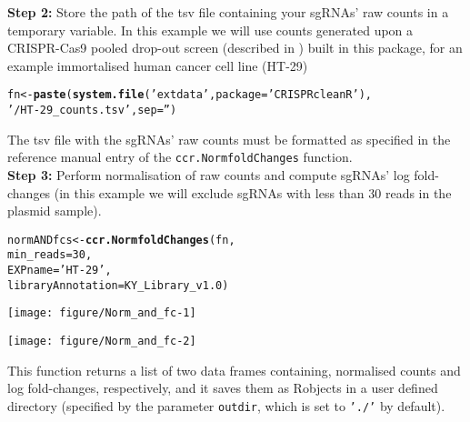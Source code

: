 \documentclass{article}\usepackage[]{graphicx}\usepackage[]{color}
\makeatletter
\def\maxwidth{ %
  \ifdim\Gin@nat@width>\linewidth
    \linewidth
  \else
    \Gin@nat@width
  \fi
}
\newcommand{\hlnum}[1]{\textcolor[rgb]{0.686,0.059,0.569}{#1}}%
\newcommand{\hlstr}[1]{\textcolor[rgb]{0.192,0.494,0.8}{#1}}%
\newcommand{\hlstd}[1]{\textcolor[rgb]{0.345,0.345,0.345}{#1}}%
\newcommand{\hlkwb}[1]{\textcolor[rgb]{0.69,0.353,0.396}{#1}}%
\newcommand{\hlkwc}[1]{\textcolor[rgb]{0.333,0.667,0.333}{#1}}%
\newcommand{\hlkwd}[1]{\textcolor[rgb]{0.737,0.353,0.396}{\textbf{#1}}}%
\newenvironment{kframe}{%
 \def\at@end@of@kframe{}%
 \ifinner\ifhmode%
  \def\at@end@of@kframe{\end{minipage}}%
  \begin{minipage}{\columnwidth}%
 \fi\fi%
 \def\FrameCommand##1{\hskip\@totalleftmargin \hskip-\fboxsep
 \colorbox{shadecolor}{##1}\hskip-\fboxsep
     \hskip-\linewidth \hskip-\@totalleftmargin \hskip\columnwidth}%
 \MakeFramed {\advance\hsize-\width
   \@totalleftmargin\z@ \linewidth\hsize
   \@setminipage}}%
 {\par\unskip\endMakeFramed%
 \at@end@of@kframe}
\newenvironment{knitrout}{}{} %
\makeatother
\begin{document}
\textbf{Step 2:} Store the path of the tsv file containing your sgRNAs' raw counts in a temporary variable. In this example we will use counts generated upon a CRISPR-Cas9 pooled drop-out screen (described in \cite{Iorio:2017}) built in this package, for an example immortalised human cancer cell line (HT-29)

\begin{knitrout}
\color{fgcolor}\begin{kframe}
\begin{alltt}
 \hlstd{fn}\hlkwb{<-}\hlkwd{paste}\hlstd{(}\hlkwd{system.file}\hlstd{(}\hlstr{'extdata'}\hlstd{,}\hlkwc{package} \hlstd{=} \hlstr{'CRISPRcleanR'}\hlstd{),}
           \hlstr{'/HT-29_counts.tsv'}\hlstd{,}\hlkwc{sep}\hlstd{=}\hlstr{''}\hlstd{)}
\end{alltt}
\end{kframe}
\end{knitrout}

The tsv file with the sgRNAs' raw counts must be formatted as specified in the reference manual entry of the \texttt{ccr.NormfoldChanges} function.\\

\textbf{Step 3:} Perform normalisation of raw counts and compute sgRNAs' log fold-changes (in this example we will exclude sgRNAs with less than 30 reads in the plasmid sample).

\begin{knitrout}
\color{fgcolor}\begin{kframe}
\begin{alltt}
\hlstd{normANDfcs}\hlkwb{<-}\hlkwd{ccr.NormfoldChanges}\hlstd{(fn,}
                                 \hlkwc{min_reads}\hlstd{=}\hlnum{30}\hlstd{,}
                                 \hlkwc{EXPname}\hlstd{=}\hlstr{'HT-29'}\hlstd{,}
                                 \hlkwc{libraryAnnotation}\hlstd{=KY_Library_v1.0)}
\end{alltt}
\end{kframe}
\texttt{[image: figure/Norm\_and\_fc-1]} 

\texttt{[image: figure/Norm\_and\_fc-2]} 

\end{knitrout}

This function returns a list of two data frames containing, normalised counts and log fold-changes, respectively, and it saves them as Robjects in a user defined directory (specified by the parameter \texttt{outdir}, which is set to \texttt{'./'} by default).
\end{document}
